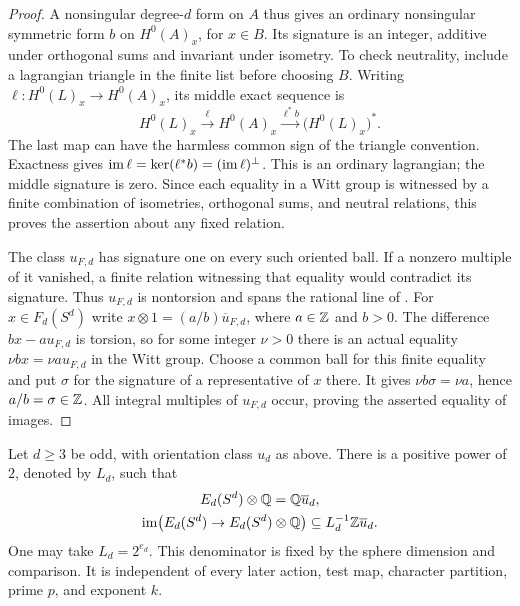 \begin{proof}
A nonsingular degree-$d$ form on $A$ thus gives an ordinary
nonsingular symmetric form $b$ on $H^0(A)_x$, for $x\in B$.
Its signature is an integer, additive under orthogonal sums and
invariant under isometry.  To check neutrality, include a
lagrangian triangle in the finite list before choosing $B$.
Writing $\ell:H^0(L)_x\to H^0(A)_x$, its middle exact sequence is
\[
 H^0(L)_x\xrightarrow{\ell}H^0(A)_x
 \xrightarrow{\ell^*b}\bigl(H^0(L)_x\bigr)^*.
\]
The last map can have the harmless common sign of the triangle
convention.  Exactness gives
$\operatorname{im}\ell=\ker(\ell^*b)=(\operatorname{im}\ell)^\perp$.
This is an ordinary lagrangian; the middle signature is zero.
Since each equality in a Witt group is witnessed by a finite
combination of isometries, orthogonal sums, and neutral
relations, this proves the assertion about any fixed relation.

The class $u_{F,d}$ has signature one on every such oriented ball.
If a nonzero multiple of it vanished, a finite relation witnessing
that equality would contradict its signature.  Thus $u_{F,d}$ is
nontorsion and spans the rational line of .
For $x\in F_d(S^d)$ write $x\otimes1=(a/b)\overline{u}_{F,d}$, where $a\in\mathbb Z$
and $b>0$.  The difference $bx-au_{F,d}$ is torsion, so for some
integer $\nu>0$ there is an actual equality
$\nu bx=\nu au_{F,d}$ in the Witt group.
Choose a common ball for this finite equality and put $\sigma$
for the signature of a representative of $x$ there.  It gives
$\nu b\sigma=\nu a$, hence $a/b=\sigma\in\mathbb Z$.  All integral multiples
of $u_{F,d}$ occur, proving the asserted equality of images.
\end{proof}

\begin{theorem}
\label{thm:sphere-lattice}
Let $d\geq3$ be odd, with orientation class $u_d$ as above.
There is a positive power of $2$,
denoted by $L_d$, such that
\begin{equation}
 \label{lat:lattice}
 \begin{gathered}
 E_d(S^d)\otimes\mathbb Q=\mathbb Q\overline{u}_d,\\
 \operatorname{im}\bigl(E_d(S^d)\to E_d(S^d)\otimes\mathbb Q\bigr)
 \subseteq L_d^{-1}\mathbb Z\overline{u}_d.
 \end{gathered}
\end{equation}
One may take $L_d=2^{e_d}$.  This denominator is fixed by the sphere
dimension and comparison.  It is independent of every later action,
test map, character partition, prime $p$, and exponent $k$.
\end{theorem}

